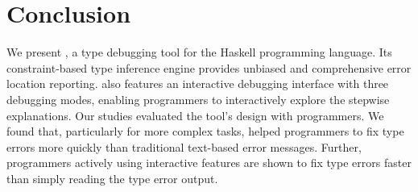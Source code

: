 \section{Conclusion}

We present \chameleon{}, a type debugging tool for the Haskell programming language. Its constraint-based type inference engine provides unbiased and comprehensive error location reporting. \chameleon{} also features an interactive debugging interface with three debugging modes, enabling programmers to interactively explore the stepwise explanations. Our studies evaluated the tool's design with programmers. We found that, particularly for more complex tasks, \chameleon{} helped programmers to fix type errors more quickly than traditional text-based error messages. Further, programmers actively using \chameleon{} interactive features are shown to fix type errors faster than simply reading the type error output.